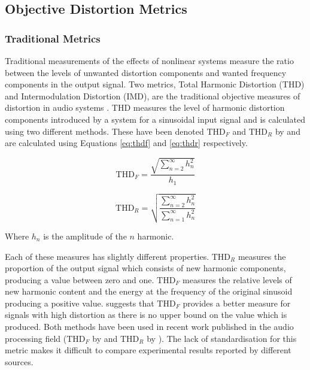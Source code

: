 	\subsection{Objective Distortion Metrics}
	\label{sec:Excitation-Analysis-Metrics}
		\subsubsection*{Traditional Metrics}
			Traditional measurements of the effects of nonlinear systems measure the ratio between the levels
			of unwanted distortion components and wanted frequency components in the output signal. Two
			metrics, Total Harmonic Distortion (THD) and Intermodulation Distortion (IMD), are the traditional
			objective measures of distortion in audio systems \citep{czerwinski2001multitone1}. THD measures
			the level of harmonic distortion components introduced by a system for a sinusoidal input signal
			and is calculated using two different methods. These have been denoted $\mathrm{THD}_{F}$ and
			$\mathrm{THD}_{R}$ by \citet{shmilovitz2005on} and are calculated using Equations \ref{eq:thdf} and
			\ref{eq:thdr} respectively.

			\begin{equation}
				\mathrm{THD}_{F} = \frac{\sqrt{\sum_{n = 2}^{\infty} h_{n}^{2}}}{h_{1}}
				\label{eq:thdf}
			\end{equation}

			\begin{equation}
				\mathrm{THD}_{R} = \sqrt{\frac{\sum_{n = 2}^{\infty} h_{n}^{2}}
								       {\sum_{n = 1}^{\infty} h_{n}^{2}}}
				\label{eq:thdr}
			\end{equation}

			Where $h_{n}$ is the amplitude of the $n$ harmonic. 

			Each of these measures has slightly different properties. $\mathrm{THD}_{R}$ measures the
			proportion of the output signal which consists of new harmonic components, producing a value
			between zero and one.  $\mathrm{THD}_{F}$ measures the relative levels of new harmonic content and
			the energy at the frequency of the original sinusoid producing a positive value.
			\citet{shmilovitz2005on} suggests that $\mathrm{THD}_{F}$ provides a better measure for signals
			with high distortion as there is no upper bound on the value which is produced.  Both methods have
			been used in recent work published in the audio processing field ($\mathrm{THD}_{F}$ by
			\citet{fleischmann2014a} and $\mathrm{THD}_{R}$ by \citet{dutilleux2011nonlinear}).  The lack of
			standardisation for this metric makes it difficult to compare experimental results reported by
			different sources.

